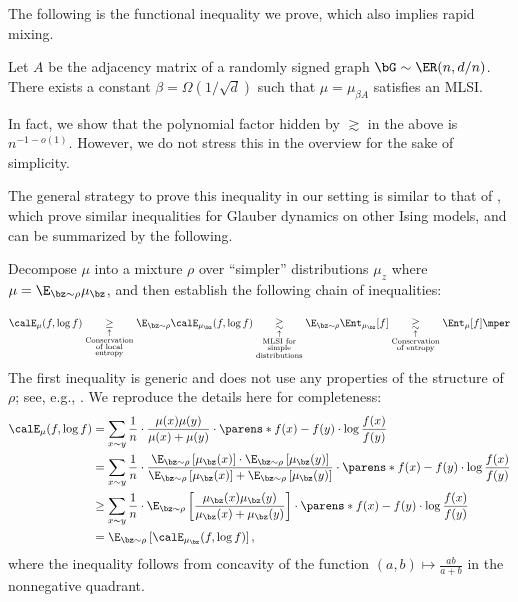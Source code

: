 \documentclass[11pt,letterpaper]{article}
\begin{document}
The following is the functional inequality we prove, which also implies rapid mixing.
\begin{theorem} \label{thm:MLSI-sparse-ising}
    Let $A$ be the adjacency matrix of a randomly signed graph $\bG\sim \ER(n,d/n)$.
    There exists a constant $\beta = \Omega(1 / \sqrt{d})$ such that $\mu = \mu_{\beta A}$ satisfies an MLSI.
\end{theorem}
\begin{remark}
    In fact, we show that the polynomial factor hidden by $\gtrsim$ in the above is $n^{-1-o(1)}$.
    However, we do not stress this in the overview for the sake of simplicity.
\end{remark}

The general strategy to prove this inequality in our setting is similar to that of \cite{EKZ22,AJKPV21a,CE22}, which prove similar inequalities for Glauber dynamics on other Ising models, and can be summarized by the following.
\begin{displayquote}
    Decompose $\mu$ into a mixture $\rho$ over ``simpler'' distributions $\mu_z$ where $\mu = \E_{\bz\sim\rho} \mu_{\bz}$, and then establish the following chain of inequalities:
\end{displayquote}
\[
    \calE_{\mu}(f, \log f) \underset{\substack{\uparrow \\ \text{Conservation} \\ \text{of local} \\ \text{entropy}}}{\geq} \E_{\bz\sim\rho} \calE_{\mu_{\bz}}(f, \log f) \underset{\substack{\uparrow\\ \text{MLSI for} \\ \text{simple} \\ \text{distributions} }}{\gtrsim} \E_{\bz\sim\rho} \Ent_{\mu_{\bz}} [f]
    \underset{\substack{\uparrow\\\text{Conservation} \\ \text{of entropy}}}{\gtrsim} \Ent_{\mu} [f]\mper
\]
The first inequality is generic and does not use any properties of the structure of $\rho$; see, e.g., \cite[Page 19]{AJKPV21a}.
We reproduce the details here for completeness:
\begin{align*}
    \calE_{\mu}(f, \log f) &= \sum_{x\sim y} \frac{1}{n} \cdot \frac{\mu(x) \mu(y)}{\mu(x)+\mu(y)}\cdot\parens*{f(x)-f(y)}\cdot\log\frac{f(x)}{f(y)} \\
    &= \sum_{x\sim y} \frac{1}{n} \cdot \frac{\E_{\bz\sim\rho}\left[\mu_{\bz}(x)\right]\cdot \E_{\bz\sim\rho}\left[\mu_{\bz}(y)\right]}{\E_{\bz\sim\rho}\left[\mu_{\bz}(x)\right]+\E_{\bz\sim\rho}\left[\mu_{\bz}(y)\right]}\cdot\parens*{f(x)-f(y)}\cdot\log\frac{f(x)}{f(y)} \\
    &\ge \sum_{x\sim y} \frac{1}{n} \cdot \E_{\bz\sim\rho}\left[\frac{\mu_{\bz}(x) \mu_{\bz}(y)}{\mu_{\bz}(x)+\mu_{\bz}(y)}\right]\cdot\parens*{f(x)-f(y)}\cdot\log\frac{f(x)}{f(y)} \\
    &= \E_{\bz\sim\rho} \left[\calE_{\mu_{\bz}}(f, \log f)\right],
\end{align*}
where the inequality follows from concavity of the function $(a,b)\mapsto\frac{ab}{a+b}$ in the nonnegative quadrant.
\end{document}
